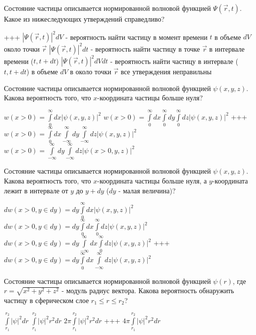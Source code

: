 \documentclass[11pt,a4paper]{exam}
\newcommand{\rightchoice}{\choice +++ }
\begin{document}
\begin{questions}

\question Состояние частицы описывается нормированной волновой функцией $\Psi (\vec r,t)$. Какое из нижеследующих утверждений справедливо?
\begin{choices}
\rightchoice ${\left| {\Psi (\vec r,t)} \right|^2}dV$ - вероятность найти частицу в момент времени $t$ в объеме $dV$ около точки $\vec r$
\choice ${\left| {\Psi (\vec r,t)} \right|^2}dt$ - вероятность найти частицу в точке $\vec r$ в интервале времени ($t,t + dt$)
\choice ${\left| {\Psi (\vec r,t)} \right|^2}dVdt$ - вероятность найти частицу в интервале ($t,t + dt$) в объеме $dV$ в около точки $\vec r$
\choice все утверждения неправильны
\end{choices}

\question Состояние частицы описывается нормированной волновой функцией $\psi (x,y,z)$. Какова вероятность того, что $x$-координата частицы больше нуля?
\begin{choices}
\choice $w(x > 0) = \int\limits_0^\infty  {dx|\psi (x,y,z){|^2}} $         
\choice $w(x > 0) = \int\limits_0^\infty  {dx\int\limits_0^\infty  {dy\int\limits_0^\infty  {dz} } |\psi (x,y,z){|^2}} $
\rightchoice $w(x > 0) = \int\limits_0^\infty  {dx\int\limits_{ - \infty }^\infty  {dy\int\limits_{ - \infty }^\infty  {dz} } |\psi (x,y,z){|^2}} $     
\choice $w(x > 0) = \int\limits_{ - \infty }^\infty  {dy\int\limits_{ - \infty }^\infty  {dz} } |\psi (x > 0,y,z){|^2}$
\end{choices}

\question Состояние частицы описывается нормированной волновой функцией $\psi (x,y,z)$. Какова вероятность того, что $x$-координата частицы больше нуля, а $y$-координата лежит в интервале от $y$ до $y + dy$ ($dy$ - малая величина)?
\begin{choices}
\choice $dw(x > 0,y \in dy) = dy\int\limits_0^\infty  {dx|\psi (x,y,z){|^2}} $      
\choice $dw(x > 0,y \in dy) = dy\int\limits_0^\infty  {dx\int\limits_0^\infty  {dz} } |\psi (x,y,z){|^2}$
\choice $dw(x > 0,y \in dy) = dy\int\limits_{ - \infty }^\infty  {dx\int\limits_0^\infty  {dz} } |\psi (x,y,z){|^2}$ 
\rightchoice $dw(x > 0,y \in dy) = dy\int\limits_0^\infty  {dx\int\limits_{ - \infty }^\infty  {dz} } |\psi (x,y,z){|^2}$
\end{choices}

\question Состояние частицы описывается нормированной волновой функцией $\psi (r)$, где $r = \sqrt {{x^2} + {y^2} + {z^2}} $ - модуль радиус вектора. Какова вероятность обнаружить частицу в сферическом слое ${r_1} \le r \le {r_2}$?
\begin{choices}
\choice $\int\limits_{{r_1}}^{{r_2}} {{{\left| \psi  \right|}^2}} dr$      
\choice $\int\limits_{{r_1}}^{{r_2}} {{{\left| \psi  \right|}^2}{r^2}} dr$    
\choice $2\pi \int\limits_{{r_1}}^{{r_2}} {{{\left| \psi  \right|}^2}} {r^2}dr$     
\rightchoice $4\pi \int\limits_{{r_1}}^{{r_2}} {{{\left| \psi  \right|}^2}{r^2}} dr$
\end{choices}


\end{questions}
\end{document}
